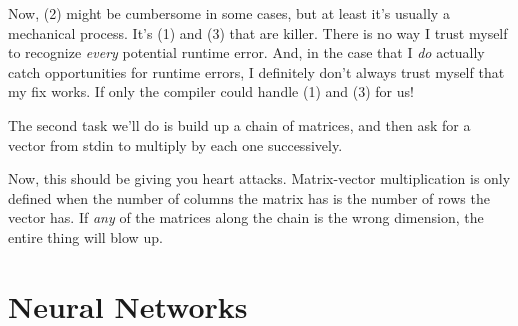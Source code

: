 \documentclass[]{article}
\newenvironment{Shaded}{}{}
\newcommand{\KeywordTok}[1]{\textcolor[rgb]{0.00,0.44,0.13}{\textbf{{#1}}}}
\newcommand{\DataTypeTok}[1]{\textcolor[rgb]{0.56,0.13,0.00}{{#1}}}
\newcommand{\OtherTok}[1]{\textcolor[rgb]{0.00,0.44,0.13}{{#1}}}
\newcommand{\FunctionTok}[1]{\textcolor[rgb]{0.02,0.16,0.49}{{#1}}}
\newcommand{\NormalTok}[1]{{#1}}
\begin{document}
Now, (2) might be cumbersome in some cases, but at least it's usually a
mechanical process. It's (1) and (3) that are killer. There is no way I
trust myself to recognize \emph{every} potential runtime error. And, in
the case that I \emph{do} actually catch opportunities for runtime
errors, I definitely don't always trust myself that my fix works. If
only the compiler could handle (1) and (3) for us!

The second task we'll do is build up a chain of matrices, and then ask
for a vector from stdin to multiply by each one successively.

\begin{Shaded}
\end{Shaded}

Now, this should be giving you heart attacks. Matrix-vector
multiplication is only defined when the number of columns the matrix has
is the number of rows the vector has. If \emph{any} of the matrices
along the chain is the wrong dimension, the entire thing will blow up.

\section{Neural Networks}\label{neural-networks}
\end{document}
